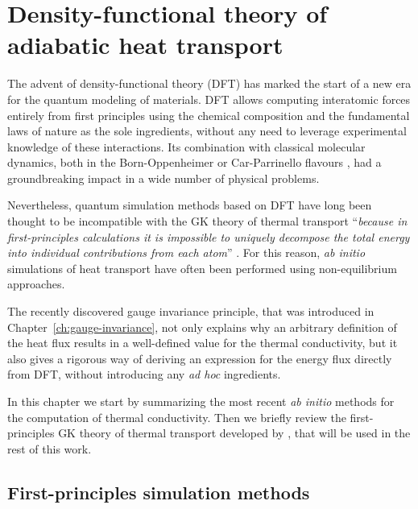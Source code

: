 \chapter{Density-functional theory of adiabatic heat transport} \label{ch:dft-heat}


\begin{LEtext}
The advent of density-functional theory (DFT) \cite{Hohenberg1964,Kohn1965} has marked the start of a new era for the quantum modeling of materials. DFT allows computing interatomic forces entirely from first principles using the chemical composition and the fundamental laws of nature as the sole ingredients, without any need to leverage experimental knowledge of these interactions.
Its combination with classical molecular dynamics, both in the Born-Oppenheimer or Car-Parrinello flavours \cite{Car1985,Marx2009}, had a groundbreaking impact in a wide number of physical problems.

Nevertheless, quantum simulation methods based on DFT have long been thought to be incompatible with the GK theory of thermal transport ``\emph{because in first-principles calculations it is impossible to uniquely decompose the total energy into individual contributions from each atom}'' \cite{Stackhouse2010b}. For this reason, \emph{ab initio} simulations of heat transport have often been performed using non-equilibrium approaches.

The recently discovered gauge invariance principle, that was introduced in Chapter~\ref{ch:gauge-invariance}, not only explains why an arbitrary definition of the heat flux results in a well-defined value for the thermal conductivity, but it also gives a rigorous way of deriving an expression for the energy flux directly from DFT, without introducing any \emph{ad hoc} ingredients.

In this chapter we start by summarizing the most recent \emph{ab initio} methods for the computation of thermal conductivity. Then we briefly review the first-principles GK theory of thermal transport developed by \citet{Marcolongo2016}, that will be used in the rest of this work.
\end{LEtext}


\newpage
\section{First-principles simulation methods}

